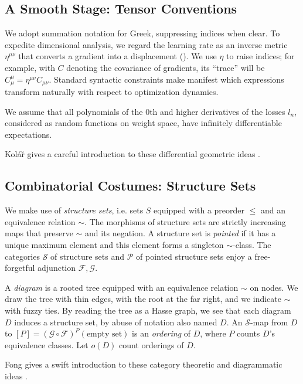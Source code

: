 \documentclass{article}
\newcommand{\Free}{\mathcal{F}}
\newcommand{\Forg}{\mathcal{G}}
\newcommand{\Ss}{\mathcal{S}}
\newcommand{\Pp}{\mathcal{P}}
\begin{document}
\subsection{A Smooth Stage: Tensor Conventions}
    We adopt summation notation for Greek, suppressing
    indices when clear.  To expedite dimensional analysis, we 
    regard the learning rate as an inverse metric $\eta^{\mu\nu}$ that
    converts a gradient into a displacement (\cite{bo13}).  We use $\eta$
    to raise indices; for example, with $C$ denoting the covariance of
    gradients, its ``trace'' will be $C^{\mu}_{\mu} = \eta^{\mu\nu}
    C_{\mu\nu}$.  Standard syntactic constraints make manifest which
    expressions transform naturally with respect to optimization dynamics.
    
    We assume that all polynomials of the $0$th and higher derivatives of the
    losses $l_n$, considered as random functions on weight space, have
    infinitely differentiable expectations.
    
    Kol\'{a}\u{r} gives a careful introduction to these differential geometric
    ideas .

\subsection{Combinatorial Costumes: Structure Sets}
    We make use of \emph{structure sets}, i.e. sets $S$ equipped with a
    preorder $\leq$ and an equivalence relation $\sim$.  The morphisms of
    structure sets are strictly increasing maps that preserve $\sim$ and its
    negation.  A structure set is \emph{pointed} if it has a unique maximum
    element and this element forms a singleton $\sim$-class.  The categories
    $\Ss$ of structure sets and $\Pp$ of pointed structure sets enjoy a
    free-forgetful adjunction $\Free, \Forg$.

    A \emph{diagram} is a rooted tree equipped with an equivalence relation
    $\sim$ on nodes.  We draw the tree with thin edges, with the root at the
    far right, and we indicate $\sim$ with fuzzy ties.  By reading the tree as
    a Hasse graph, we see that each diagram $D$ induces a structure set, by
    abuse of notation also named $D$.  An $\Ss$-map from $D$ to
    $[P]=(\Forg\circ\Free)^P(\text{empty set})$ is an \emph{ordering} of $D$,
    where $P$ counts $D$'s equivalence classes.  Let $o(D)$ count orderings of
    $D$.

    Fong gives a swift introduction to these category theoretic and
    diagrammatic ideas .
        
\end{document}
